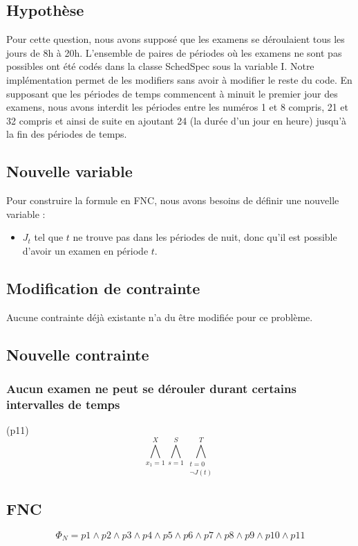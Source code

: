 \documentclass[a4paper,11pt]{article}
\begin{document}
\subsection{Hypothèse}
Pour cette question, nous avons supposé que les examens se déroulaient tous les jours de 8h à 20h. L'ensemble de paires de périodes où les examens ne sont pas possibles ont été codés dans la classe SchedSpec sous la variable I. Notre implémentation permet de les modifiers sans avoir à modifier le reste du code.
En supposant que les périodes de temps commencent à minuit le premier jour des examens, nous avons interdit les périodes entre les numéros 1 et 8 compris, 21 et 32 compris et ainsi de suite en ajoutant 24 (la durée d'un jour en heure) jusqu'à la fin des périodes de temps.

\subsection{Nouvelle variable}

Pour construire la formule en FNC, nous avons besoins de définir une nouvelle variable :  
\begin{itemize}
	\item \( J_{t}\) tel que $t$  ne trouve pas dans les périodes de nuit, donc qu'il est possible d'avoir un examen en période $t$.
\end{itemize}

\subsection{Modification de contrainte}
Aucune contrainte déjà existante n'a du être modifiée pour ce problème.

\subsection{Nouvelle contrainte}

\subsubsection{Aucun examen ne peut se dérouler durant certains intervalles de temps}
(p11)
\begin{displaymath}
\bigwedge\limits_{x_{1}=1}^{X}\bigwedge\limits_{s=1}^{S}\bigwedge\limits_{\substack{t=0 \\ \neg J(t) }}^{T} \end{displaymath}

\subsection{FNC}
\begin{displaymath}
	\Phi_{N} = p1 \wedge p2 \wedge p3 \wedge p4 \wedge p5 \wedge p6 \wedge p7 \wedge p8 \wedge p9 \wedge p10 \wedge p11
\end{displaymath}
\end{document}

